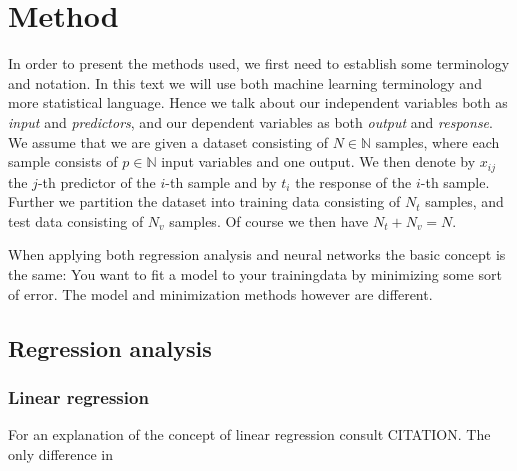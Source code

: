 \documentclass[a4paper,english]{article}
\begin{document}
\section{Method}
In order to present the methods used, 
we first need to establish some terminology and notation. 
In this text we will use both machine learning terminology and more 
statistical language. Hence we talk about our independent variables both
as \textit{input} and \textit{predictors}, and our dependent 
variables as both \textit{output} and \textit{response}.
We assume that we are given a dataset consisting of 
$N \in \mathbb{N}$ samples, where each sample consists of $p\in\mathbb{N}$ 
input variables
and one output. We then denote by $x_{ij}$ the $j$-th predictor of
the $i$-th sample and by $t_i$ the response of the $i$-th sample. 
Further we partition the dataset into training data consisting of
$N_t$ samples, and test data consisting of $N_v$ samples. Of course we
then have $N_t + N_v = N$.
\par
When applying both regression analysis and neural 
networks the basic concept is the same:
You want to fit a model to your trainingdata by minimizing some sort of 
error. The model and minimization methods however are different.

\subsection{Regression analysis}
\subsubsection{Linear regression}
For an explanation of the concept of linear regression consult CITATION.
The only difference in 
\end{document}
